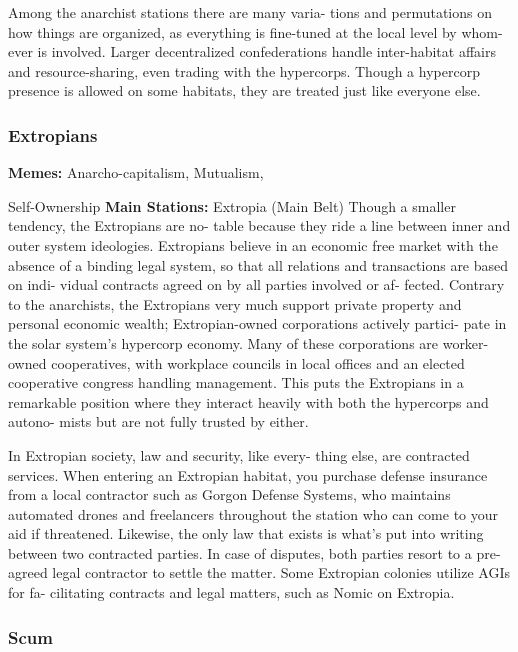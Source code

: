 Among the anarchist stations there are many varia-
tions and permutations on how things are organized, 
as everything is fine-tuned at the local level by whom-
ever is involved. Larger decentralized confederations 
handle inter-habitat affairs and resource-sharing, even 
trading with the hypercorps. Though a hypercorp 
presence is allowed on some habitats, they are treated 
just like everyone else.

\subsubsection{Extropians}

\textbf{Memes:} Anarcho-capitalism, Mutualism, 

Self-Ownership
\textbf{Main Stations:} Extropia (Main Belt)
Though a smaller tendency, the Extropians are no-
table because they ride a line between inner and outer 
system ideologies. Extropians believe in an economic 
free market with the absence of a binding legal system, 
so that all relations and transactions are based on indi-
vidual contracts agreed on by all parties involved or af-
fected. Contrary to the anarchists, the Extropians very 
much support private property and personal economic 
wealth; Extropian-owned corporations actively partici-
pate in the solar system's hypercorp economy. Many 
of these corporations are worker-owned cooperatives, 
with workplace councils in local offices and an elected 
cooperative congress handling management. This puts 
the Extropians in a remarkable position where they 
interact heavily with both the hypercorps and autono-
mists but are not fully trusted by either.

In Extropian society, law and security, like every-
thing else, are contracted services. When entering an 
Extropian habitat, you purchase defense insurance 
from a local contractor such as Gorgon Defense 
Systems, who maintains automated drones and 
freelancers throughout the station who can come 
to your aid if threatened. Likewise, the only law 
that exists is what's put into writing between two 
contracted parties. In case of disputes, both parties 
resort to a pre-agreed legal contractor to settle the 
matter. Some Extropian colonies utilize AGIs for fa-
cilitating contracts and legal matters, such as Nomic 
on Extropia.

\subsubsection{Scum}

